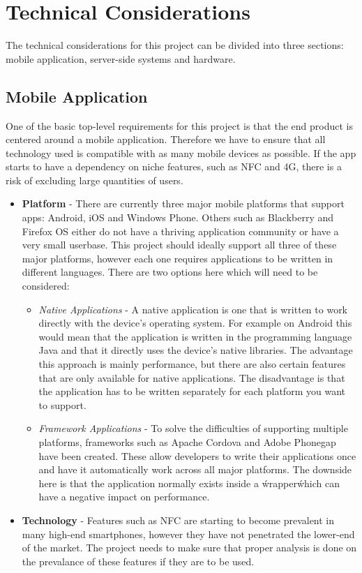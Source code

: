 \section{Technical Considerations}

The technical considerations for this project can be divided into three sections: mobile application, server-side systems and hardware.

\subsection{Mobile Application}

One of the basic top-level requirements for this project is that the end product is centered around a mobile application. Therefore we have to ensure that all technology used is compatible with as many mobile devices as possible. If the app starts to have a dependency on niche features, such as NFC and 4G, there is a risk of excluding large quantities of users.

\begin{itemize}
  \item \textbf{Platform} - 
    There are currently three major mobile platforms that support apps: Android, iOS and Windows Phone. Others such as Blackberry and Firefox OS either do not have a thriving application community or have a very small userbase. This project should ideally support all three of these major platforms, however each one requires applications to be written in different languages. There are two options here which will need to be considered:
    \begin{itemize}
      \item \emph{Native Applications} - A native application is one that is written to work directly with the device's operating system. For example on Android this would mean that the application is written in the programming language Java and that it directly uses the device's native libraries. The advantage this approach is mainly performance, but there are also certain features that are only available for native applications. The disadvantage is that the application has to be written separately for each platform you want to support.
      \item \emph{Framework Applications} - To solve the difficulties of supporting multiple platforms, frameworks such as Apache Cordova and Adobe Phonegap have been created. These allow developers to write their applications once and have it automatically work across all major platforms. The downside here is that the application normally exists inside a \'wrapper\' which can have a negative impact on performance.
    \end{itemize}
  \item \textbf{Technology} - 
    Features such as NFC are starting to become prevalent in many high-end smartphones, however they have not penetrated the lower-end of the market. The project needs to make sure that proper analysis is done on the prevalance of these features if they are to be used.
\end{itemize}



